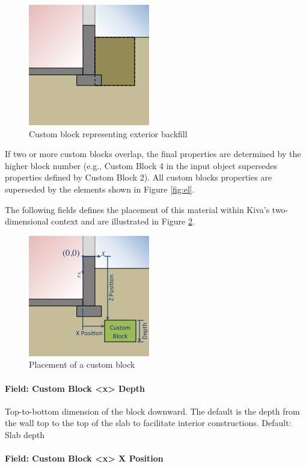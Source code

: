 \begin{figure}
\centering
\includegraphics{media/kiva-2d-custom-ex-fill.png}
\caption{Custom block representing exterior backfill\label{fig:cf}}
\end{figure}

If two or more custom blocks overlap, the final properties are
determined by the higher block number (e.g., Custom Block 4 in the input
object supersedes properties defined by Custom Block 2). All custom
blocks properties are superseded by the elements shown in Figure
\ref{fig:el}.

The following fields defines the placement of this material within
Kiva's two-dimensional context and are illustrated in Figure
\ref{fig:custom}.

\begin{figure}
\centering
\includegraphics{media/kiva-2d-custom.png}
\caption{Placement of a custom block\label{fig:custom}}
\end{figure}

\paragraph{Field: Custom Block \textless{}x\textgreater{}
Depth}

Top-to-bottom dimension of the block downward. The default is the depth
from the wall top to the top of the slab to facilitate interior
constructions. Default: Slab depth

\paragraph{Field: Custom Block \textless{}x\textgreater{} X
Position}

